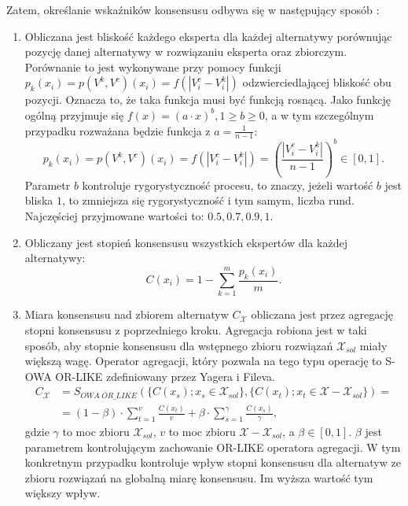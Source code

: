 Zatem, określanie wskaźników konsensusu odbywa się w następujący sposób
\cite{Herrera-Viedma2002}:
\begin{enumerate}
  \item Obliczana jest bliskość każdego eksperta dla każdej alternatywy
  porównując pozycję danej alternatywy w rozwiązaniu eksperta oraz zbiorczym.
  Porównanie to jest wykonywane przy pomocy funkcji $p_k(x_i) = p(V^k,V^c)(x_i)
  = f(|V^c_i - V^k_i|)$ odzwierciedlającej bliskość obu pozycji. Oznacza to, że
  taka funkcja musi być funkcją rosnącą. Jako funkcję ogólną przyjmuje się
  $f(x) = (a \cdot x)^b, 1 \geq b \geq 0$, a w tym szczególnym przypadku
  rozważana będzie funkcja z $a = \frac{1}{n-1}$:
  \begin{equation}
  p_k(x_i) = p(V^k,V^c)(x_i) = f(|V^c_i - V^k_i|) = (\frac{|V^c_i -
  V^k_i|}{n-1})^b \in [0,1].
  \end{equation}
  Parametr $b$ kontroluje rygorystyczność procesu, to znaczy, jeżeli wartość $b$
  jest bliska $1$, to zmniejsza się rygorystyczność i tym samym, liczba rund.
  Najczęściej przyjmowane wartości to: $0.5, 0.7, 0.9, 1$.
  
  \item Obliczany jest stopień konsensusu wszystkich ekspertów dla każdej
  alternatywy:
  \begin{equation}
  C(x_i) = 1 - \sum_{k=1}^{m} \frac{p_k(x_i)}{m}.
  \end{equation}
  
  \item Miara konsensusu nad zbiorem alternatyw $C_{\mathcal{X}}$ obliczana jest
  przez agregację stopni konsensusu z poprzedniego kroku. Agregacja
  robiona jest w taki sposób, aby stopnie konsensusu dla wstępnego zbioru
  rozwiązań $\mathcal{X}_{sol}$ miały większą wagę. Operator agregacji, który
  pozwala na tego typu operację to S-OWA OR-LIKE zdefiniowany przez Yagera i
  Fileva.
  \begin{equation}
  \begin{split}
  C_{\mathcal{X}} &= S_{OWA \; OR\_LIKE}(\{ C(x_s); x_s \in
  \mathcal{X}_{sol}\}, \{ C(x_t); x_t \in \mathcal{X} - \mathcal{X}_{sol} \}) =
  \\ 
  &= (1 - \beta)\cdot \sum_{t=1}^{v} \frac{C(x_t)}{v} + \beta \cdot
  \sum_{s=1}^{\gamma} \frac{C(x_s)}{\gamma},
  \end{split}
  \end{equation}
  gdzie $\gamma$ to moc zbioru $\mathcal{X}_{sol}$, $v$ to moc zbioru
  $\mathcal{X} - \mathcal{X}_{sol}$, a $\beta \in [0,1].$ $\beta$ jest
  parametrem kontrolującym zachowanie OR-LIKE operatora agregacji. W tym
  konkretnym przypadku kontroluje wpływ stopni konsensusu dla alternatyw ze
  zbioru rozwiązań na globalną miarę konsensusu. Im wyższa wartość tym większy
  wpływ.
  

\end{enumerate}
